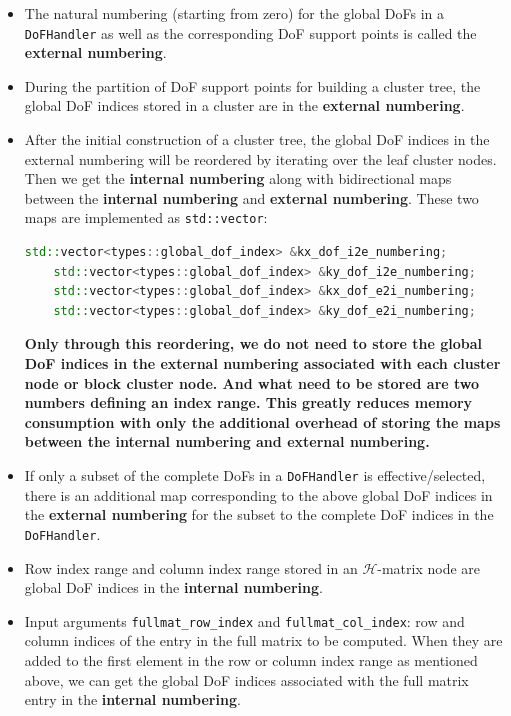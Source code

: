 \documentclass[11pt, a4paper]{book}
\begin{document}
\begin{itemize}
\item The natural numbering (starting from zero) for the global DoFs in a
  \texttt{DoFHandler} as well as the corresponding DoF support points is called the
  \textbf{external numbering}.
\item During the partition of DoF support points for building a cluster tree, the global
  DoF indices stored in a cluster are in the \textbf{external numbering}.
\item After the initial construction of a cluster tree, the global DoF indices in the
  external numbering will be reordered by iterating over the leaf cluster nodes. Then we
  get the \textbf{internal numbering} along with bidirectional maps between the
  \textbf{internal numbering} and \textbf{external numbering}. These two maps are
  implemented as \texttt{std::vector}:
  \begin{lstlisting}[language=C++]
    std::vector<types::global_dof_index> &kx_dof_i2e_numbering;
    std::vector<types::global_dof_index> &ky_dof_i2e_numbering;
    std::vector<types::global_dof_index> &kx_dof_e2i_numbering;
    std::vector<types::global_dof_index> &ky_dof_e2i_numbering;
  \end{lstlisting}
  \textbf{Only through this reordering, we do not need to store the global DoF indices in
    the external numbering associated with each cluster node or block cluster node. And
    what need to be stored are two numbers defining an index range. This greatly reduces
    memory consumption with only the additional overhead of storing the maps between the
    internal numbering and external numbering.}
\item If only a subset of the complete DoFs in a \texttt{DoFHandler} is
  effective/selected, there is an additional map corresponding to the above global DoF
  indices in the \textbf{external numbering} for the subset to the complete DoF indices in
  the \texttt{DoFHandler}.
\item Row index range and column index range stored in an \(\mathcal{H}\)-matrix node are
  global DoF indices in the \textbf{internal numbering}.
\item Input arguments \texttt{fullmat\_row\_index} and \texttt{fullmat\_col\_index}: row
  and column indices of the entry in the full matrix to be computed. When they are added
  to the first element in the row or column index range as mentioned above, we can get the
  global DoF indices associated with the full matrix entry in the \textbf{internal
    numbering}.

\end{itemize}
\end{document}

